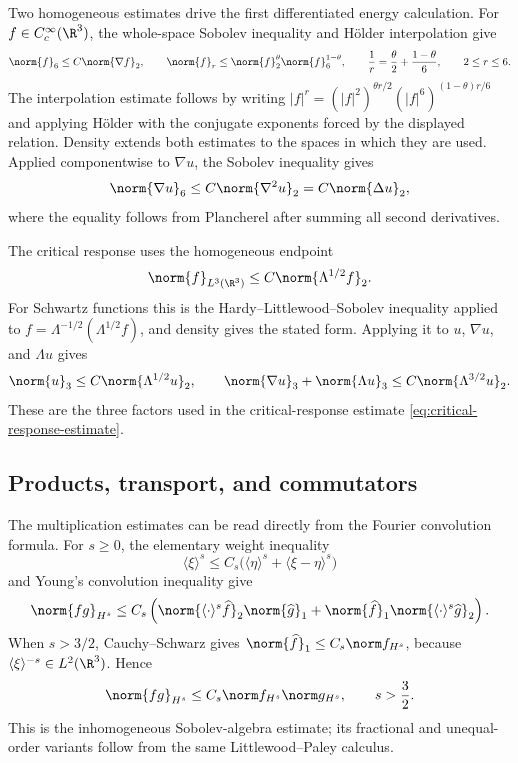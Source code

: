Two homogeneous estimates drive the first differentiated energy calculation.
For \(f\in C_c^\infty(\R^3)\), the whole-space Sobolev inequality and Hölder interpolation give
\begin{equation}
 \norm{f}_6\le C\norm{\nabla f}_2,
 \qquad
 \norm{f}_r\le\norm{f}_2^\theta\norm{f}_6^{1-\theta},
 \qquad
 \frac1r=\frac\theta2+\frac{1-\theta}{6},
 \qquad
 2\le r\le6.
 \label{eq:appendix-homogeneous-Sobolev-interpolation}
\end{equation}
The interpolation estimate follows by writing \(|f|^r=(|f|^2)^{\theta r/2}(|f|^6)^{(1-\theta)r/6}\) and applying Hölder with the conjugate exponents forced by the displayed relation.
Density extends both estimates to the spaces in which they are used.
Applied componentwise to \(\nabla u\), the Sobolev inequality gives
\[
 \norm{\nabla u}_6\le C\norm{\nabla^2u}_2=C\norm{\Delta u}_2,
\]
where the equality follows from Plancherel after summing all second derivatives.

The critical response uses the homogeneous endpoint
\[
 \norm{f}_{L^3(\R^3)}\le C\norm{\Lambda^{1/2}f}_2.
\]
For Schwartz functions this is the Hardy--Littlewood--Sobolev inequality applied to \(f=\Lambda^{-1/2}(\Lambda^{1/2}f)\), and density gives the stated form.
Applying it to \(u\), \(\nabla u\), and \(\Lambda u\) gives
\[
 \norm{u}_3\le C\norm{\Lambda^{1/2}u}_2,
 \qquad
 \norm{\nabla u}_3+\norm{\Lambda u}_3\le C\norm{\Lambda^{3/2}u}_2.
\]
These are the three factors used in the critical-response estimate \eqref{eq:critical-response-estimate}.

\subsection{Products, transport, and commutators}

The multiplication estimates can be read directly from the Fourier convolution formula.
For \(s\ge0\), the elementary weight inequality
\[
 \langle\xi\rangle^s\le C_s\bigl(\langle\eta\rangle^s+\langle\xi-\eta\rangle^s\bigr)
\]
and Young's convolution inequality give
\[
 \norm{fg}_{H^s}
 \le C_s\left(
 \norm{\langle\cdot\rangle^s\widehat f}_2\norm{\widehat g}_1
 +\norm{\widehat f}_1\norm{\langle\cdot\rangle^s\widehat g}_2
 \right).
\]
When \(s>3/2\), Cauchy--Schwarz gives \(\norm{\widehat f}_1\le C_s\norm f_{H^s}\), because \(\langle\xi\rangle^{-s}\in L^2(\R^3)\).
Hence
\begin{equation}
 \norm{fg}_{H^s}\le C_s\norm f_{H^s}\norm g_{H^s},
 \qquad
 s>\frac32.
 \label{eq:appendix-Hs-algebra}
\end{equation}
This is the inhomogeneous Sobolev-algebra estimate; its fractional and unequal-order variants follow from the same Littlewood--Paley calculus.

